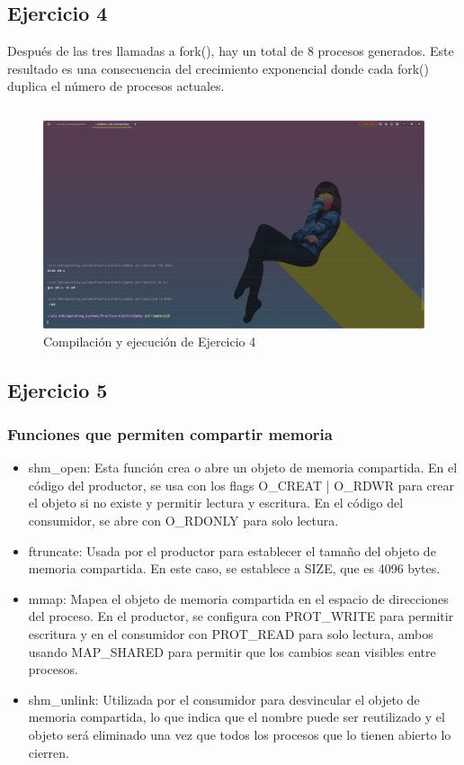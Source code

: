 \documentclass{article}
\newenvironment{code}{\captionsetup{type=listing}}{}
\begin{document}
\subsection{Ejercicio 4}
Después de las tres llamadas a fork(), hay un total de 8 procesos 
generados. Este resultado es una consecuencia del crecimiento 
exponencial donde cada fork() duplica el número de procesos actuales.
\begin{code}
	\inputminted{c}{../Ejercicios/e4.c}
\end{code}
\begin{figure}[h]
	\caption{Compilación y ejecución de Ejercicio 4}
	\centering
	\includegraphics[scale=0.3,trim={0 0 20cm 26cm},clip]{ejer-e4.png}
\end{figure}

\subsection{Ejercicio 5}
\subsubsection*{Funciones que permiten compartir memoria}
    \begin{itemize}
        \item shm\_open: Esta función crea o abre un objeto de memoria
		compartida. En el código del productor, se usa con los flags
		O\_CREAT | O\_RDWR para crear el objeto si no existe y 
		permitir lectura y escritura. En el código del consumidor, 
		se abre con O\_RDONLY para solo lectura.
        \item ftruncate: Usada por el productor para establecer el 
		tamaño del objeto de memoria compartida. En este caso, se 
		establece a SIZE, que es 4096 bytes.
        \item mmap: Mapea el objeto de memoria compartida en el espacio 
		de direcciones del proceso. En el productor, se configura con 
		PROT\_WRITE para permitir escritura y en el consumidor con 
		PROT\_READ para solo lectura, ambos usando MAP\_SHARED para 
		permitir que los cambios sean visibles entre procesos.
        \item shm\_unlink: Utilizada por el consumidor para desvincular 
		el objeto de memoria compartida, lo que indica que el nombre 
		puede ser reutilizado y el objeto será eliminado una vez que 
		todos los procesos que lo tienen abierto lo cierren.
	\end{itemize}
\end{document}
